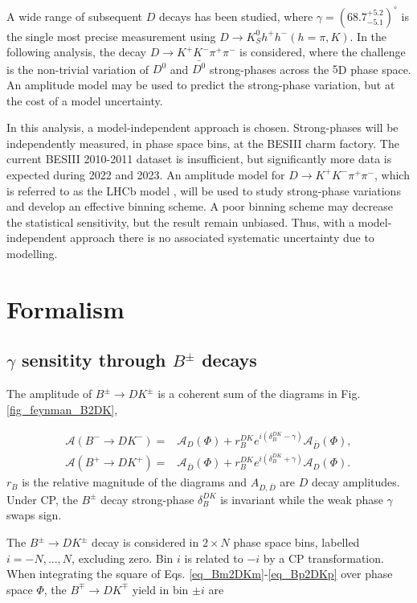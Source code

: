 \documentclass[12pt, a4paper, notitlepage, onecolumn]{article}
\begin{document}
A wide range of subsequent $D$ decays has been studied, where $\gamma = (68.7^{+5.2}_{-5.1})^\circ$ is the single most precise measurement using $D\to K_S^0h^+h^-(h = \pi, K)$\cite{cite_LHCbGGSZKSpipi}. In the following analysis, the decay $D\to K^+K^-\pi^+\pi^-$ is considered, where the challenge is the non-trivial variation of $D^0$ and $\bar{D^0}$ strong-phases across the $5$D phase space. An amplitude model may be used to predict the strong-phase variation, but at the cost of a model uncertainty.

In this analysis, a model-independent approach is chosen. Strong-phases will be independently measured, in phase space bins, at the BESIII charm factory. The current BESIII 2010-2011 dataset is insufficient, but significantly more data is expected during 2022 and 2023. An amplitude model for $D\to K^+K^-\pi^+\pi^-$, which is referred to as the LHCb model \cite{cite_AmplitudeModel}, will be used to study strong-phase variations and develop an effective binning scheme. A poor binning scheme may decrease the statistical sensitivity, but the result remain unbiased. Thus, with a model-independent approach there is no associated systematic uncertainty due to modelling.

\section{Formalism}
\subsection{\texorpdfstring{$\gamma$}{gamma} sensitity through \texorpdfstring{$B^\pm$}{B} decays}
The amplitude of $B^\pm\to DK^\pm$ is a coherent sum of the diagrams in Fig. \ref{fig_feynman_B2DK},

\begin{align}
  \mathcal{A}(B^-\to DK^-) =& \mathcal{A}_D(\Phi) + r_B^{DK}e^{i(\delta_B^{DK} - \gamma)}\mathcal{A}_{\bar{D}}(\Phi), \label{eq_Bm2DKm} \\
  \mathcal{A}(B^+\to DK^+) =& \mathcal{A}_{\bar{D}}(\Phi) + r_B^{DK}e^{i(\delta_B^{DK} + \gamma)}\mathcal{A}_D(\Phi). \label{eq_Bp2DKp}
\end{align}
$r_B$ is the relative magnitude of the diagrams and $A_{D, \bar{D}}$ are $D$ decay amplitudes. Under CP, the $B^\pm$ decay strong-phase $\delta_B^{DK}$ is invariant while the weak phase $\gamma$ swaps sign.

The $B^\pm\to DK^\pm$ decay is considered in $2\times N$ phase space bins, labelled $i = -N, ..., N$, excluding zero. Bin $i$ is related to $-i$ by a CP transformation. When integrating the square of Eqs. \eqref{eq_Bm2DKm}-\eqref{eq_Bp2DKp} over phase space $\Phi$, the $B^\mp\to DK^\mp$ yield in bin $\pm i$ are
\end{document}
